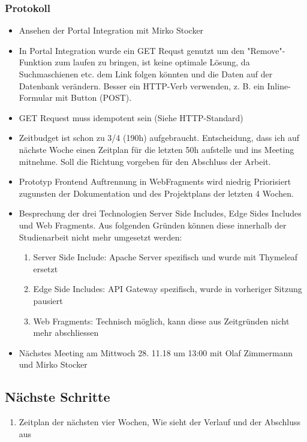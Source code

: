 \documentclass{article}
\begin{document}
\subsubsection{Protokoll}
\begin{itemize}
    \item Ansehen der Portal Integration mit Mirko Stocker
    \item In Portal Integration wurde ein GET Requst genutzt um den "Remove"-Funktion zum laufen zu bringen, ist keine optimale Lösung, da Suchmaschienen etc. dem Link folgen könnten und die Daten auf der Datenbank verändern. Besser ein HTTP-Verb verwenden, z. B. ein Inline-Formular mit Button (POST).
    \item GET Request muss idempotent sein (Siehe HTTP-Standard)
    \item Zeitbudget ist schon zu 3/4 (190h) aufgebraucht. Entscheidung, dass ich auf nächste Woche einen Zeitplan für die letzten 50h aufstelle und ins Meeting mitnehme. Soll die Richtung vorgeben für den Abschluss der Arbeit.
    \item Prototyp Frontend Auftrennung in WebFragments wird niedrig Priorisiert zugunsten der Dokumentation und des Projektplans der letzten 4 Wochen.
    \item Besprechung der drei Technologien Server Side Includes, Edge Sides Includes und Web Fragments. Aus folgenden Gründen können diese innerhalb der Studienarbeit nicht mehr umgesetzt werden:
    \begin{enumerate}
        \item Server Side Include: Apache Server spezifisch und wurde mit Thymeleaf ersetzt
        \item Edge Side Includes: API Gateway spezifisch, wurde in vorheriger Sitzung pausiert
        \item Web Fragments: Technisch möglich, kann diese aus Zeitgründen nicht mehr abschliessen
    \end{enumerate}
    \item Nächstes Meeting am Mittwoch 28. 11.18 um 13:00 mit Olaf Zimmermann und Mirko Stocker
\end{itemize}
\subsection{Nächste Schritte}
    \begin{enumerate}
        \item Zeitplan der nächsten vier Wochen, Wie sieht der Verlauf und der Abschluss aus
    \end{enumerate}
\end{document}
